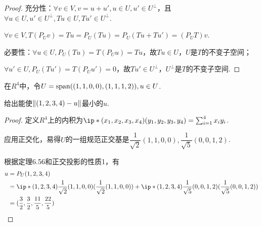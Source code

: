 \begin{proof}
    充分性：\(\forall v \in V,v=u+u',u \in U,u' \in U^\bot\)，且\(\forall u \in U,u' \in U^\bot,Tu \in U,Tu' \in U^\bot\).

    \(\forall v \in V,T(P_U v)=Tu=P_U(Tu)=P_U(Tu+Tu')=(P_U T)v\).
    
    必要性：\(\forall u \in U,P_U(Tu)=T(P_U u)=Tu\)，故\(Tu \in U\)，\(U\)是\(T\)的不变子空间；
    
    \(\forall u' \in U,P_U(Tu')=T(P_U u')=0\)，故\(Tu' \in U^\bot\)，\(U^\bot\)是\(T\)的不变子空间.
\end{proof}

\begin{problem}[11]\label{6.C.11}
    在\(R^4\)中，令\(U=\altspan((1,1,0,0),(1,1,1,2)),u \in U\).
    
    给出能使\(\norm*{(1,2,3,4)-u}\)最小的\(u\).
\end{problem}

\begin{proof}
    定义\(R^4\)上的内积为\(\ip*{(x_1,x_2,x_3,x_4)}{(y_1,y_2,y_3,y_4)}=\sum_{i=1}^4 x_iy_i\).

    应用正交化，易得\(U\)的一组规范正交基是\(\dfrac{1}{\sqrt{2}}(1,1,0,0),\dfrac{1}{\sqrt{5}}(0,0,1,2)\).
    
    根据定理6.56和正交投影的性质1，有
    \begin{align*}
        u&=P_U(1,2,3,4) \\
        &=\ip*{(1,2,3,4)}{\dfrac{1}{\sqrt{2}}(1,1,0,0)}(\dfrac{1}{\sqrt{2}}(1,1,0,0))
        +\ip*{(1,2,3,4)}{\dfrac{1}{\sqrt{5}}(0,0,1,2)}(\dfrac{1}{\sqrt{5}}(0,0,1,2)) \\
        &=(\dfrac{3}{2},\dfrac{3}{2},\dfrac{11}{5},\dfrac{22}{5})
    \end{align*}
\end{proof}

